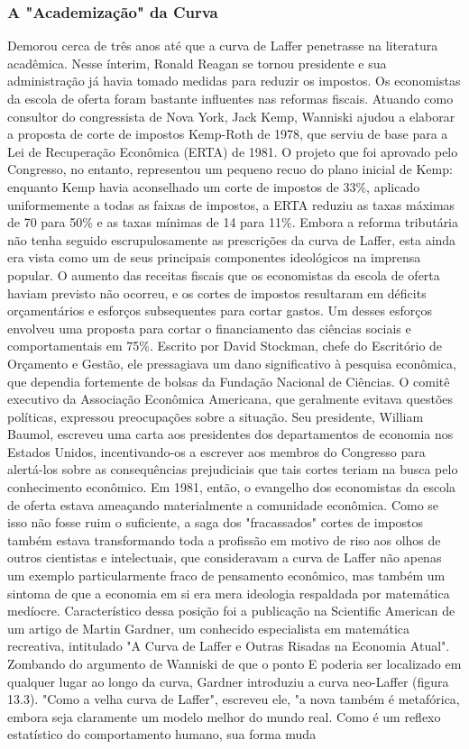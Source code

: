 \documentclass[12pt]{article}
\begin{document}
\subsubsection{\textbf{A "Academização" da Curva}}

Demorou cerca de três anos até que a curva de Laffer penetrasse na literatura acadêmica. Nesse ínterim, Ronald Reagan se tornou presidente e sua administração já havia tomado medidas para reduzir os impostos. Os economistas da escola de oferta foram bastante influentes nas reformas fiscais. Atuando como consultor do congressista de Nova York, Jack Kemp, Wanniski ajudou a elaborar a proposta de corte de impostos Kemp-Roth de 1978, que serviu de base para a Lei de Recuperação Econômica (ERTA) de 1981. O projeto que foi aprovado pelo Congresso, no entanto, representou um pequeno recuo do plano inicial de Kemp: enquanto Kemp havia aconselhado um corte de impostos de 33\%, aplicado uniformemente a todas as faixas de impostos, a ERTA reduziu as taxas máximas de 70 para 50\% e as taxas mínimas de 14 para 11\%. Embora a reforma tributária não tenha seguido escrupulosamente as prescrições da curva de Laffer, esta ainda era vista como um de seus principais componentes ideológicos na imprensa popular. O aumento das receitas fiscais que os economistas da escola de oferta haviam previsto não ocorreu, e os cortes de impostos resultaram em déficits orçamentários e esforços subsequentes para cortar gastos. Um desses esforços envolveu uma proposta para cortar o financiamento das ciências sociais e comportamentais em 75\%. Escrito por David Stockman, chefe do Escritório de Orçamento e Gestão, ele pressagiava um dano significativo à pesquisa econômica, que dependia fortemente de bolsas da Fundação Nacional de Ciências. O comitê executivo da Associação Econômica Americana, que geralmente evitava questões políticas, expressou preocupações sobre a situação. Seu presidente, William Baumol, escreveu uma carta aos presidentes dos departamentos de economia nos Estados Unidos, incentivando-os a escrever aos membros do Congresso para alertá-los sobre as consequências prejudiciais que tais cortes teriam na busca pelo conhecimento econômico. Em 1981, então, o evangelho dos economistas da escola de oferta estava ameaçando materialmente a comunidade econômica. Como se isso não fosse ruim o suficiente, a saga dos "fracassados" cortes de impostos também estava transformando toda a profissão em motivo de riso aos olhos de outros cientistas e intelectuais, que consideravam a curva de Laffer não apenas um exemplo particularmente fraco de pensamento econômico, mas também um sintoma de que a economia em si era mera ideologia respaldada por matemática medíocre. Característico dessa posição foi a publicação na Scientific American de um artigo de Martin Gardner, um conhecido especialista em matemática recreativa, intitulado "A Curva de Laffer e Outras Risadas na Economia Atual". Zombando do argumento de Wanniski de que o ponto E poderia ser localizado em qualquer lugar ao longo da curva, Gardner introduziu a curva neo-Laffer (figura 13.3). "Como a velha curva de Laffer", escreveu ele, "a nova também é metafórica, embora seja claramente um modelo melhor do mundo real. Como é um reflexo estatístico do comportamento humano, sua forma muda 
\end{document}
